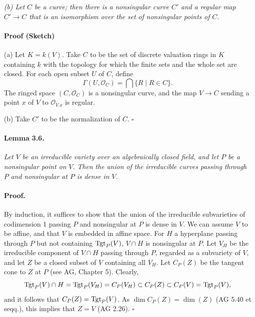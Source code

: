\textit{(b) Let $C$ be a curve; then there is a nonsingular curve $C'$ and a
regular map $C' \to C$ that is an isomorphism over the set of nonsingular
points of $C$.}

\paragraph{Proof (Sketch)}
(a) Let $K = k(V)$. Take $C$ to be the set of discrete valuation rings in
$K$ containing $k$ with the topology for which the finite sets and the whole
set are closed. For each open subset $U$ of $C$, define
\[
  \Gamma(U, \mathcal{O}_C) = \bigcap \{ R \mid R \in C \}.
\]
The ringed space $(C, \mathcal{O}_C)$ is a nonsingular curve, and the map
$V \to C$ sending a point $x$ of $V$ to $\mathcal{O}_{V.x}$ is regular.

(b) Take $C'$ to be the normalization of $C$. \hfill $\square$

\paragraph{Lemma 3.6.}
\textit{Let $V$ be an irreducible variety over an algebraically closed
field, and let $P$ be a nonsingular point on $V$. Then the union of the
irreducible curves passing through $P$ and nonsingular at $P$ is dense in
$V$.}

\paragraph{Proof.}
By induction, it suffices to show that the union of the irreducible
subvarieties of codimension 1 passing $P$ and nonsingular at $P$ is dense in
$V$.
We can assume $V$ to be affine, and that $V$ is embedded in affine space.
For $H$ a hyperplane passing through $P$ but not containing $\operatorname{Tgt}_P(V)$,
$V \cap H$ is nonsingular at $P$. Let $V_H$ be the irreducible component of
$V \cap H$ passing through $P$, regarded as a subvariety of $V$, and let $Z$
be a closed subset of $V$ containing all $V_H$. Let $C_P(Z)$ be the tangent
cone to $Z$ at $P$ (see AG, Chapter 5). Clearly,
\[
  \operatorname{Tgt}_P(V) \cap H = \operatorname{Tgt}_P(V_H) = C_P(V_H) \subset C_P(Z) \subset C_P(V)
    = \operatorname{Tgt}_P(V),
\]
and it follows that $C_P(Z) = \operatorname{Tgt}_P(V)$. As
$\dim C_P(Z) = \dim(Z)$ (AG 5.40 et seqq.), this implies that $Z = V$
(AG 2.26). \hfill $\square$
